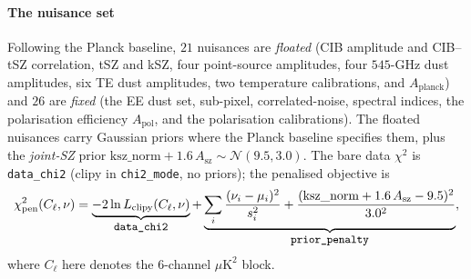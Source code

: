 \documentclass[11pt]{article}
\newcommand{\code}[1]{\texttt{\small #1}}
\newcommand{\Cl}{C_\ell}
\newcommand{\chisq}{\chi^2}
\begin{document}
\paragraph{The nuisance set}
Following the Planck baseline, $21$ nuisances are \emph{floated}
(CIB amplitude and CIB--tSZ correlation, tSZ and kSZ, four point-source
amplitudes, four $545$-GHz dust amplitudes, six TE dust amplitudes, two
temperature calibrations, and $A_{\mathrm{planck}}$) and $26$ are
\emph{fixed} (the EE dust set, sub-pixel, correlated-noise, spectral
indices, the polarisation efficiency $A_{\mathrm{pol}}$, and the
polarisation calibrations). The floated nuisances carry Gaussian priors
where the Planck baseline specifies them, plus the \emph{joint-SZ} prior
$\mathrm{ksz\_norm}+1.6\,A_{\mathrm{sz}}\sim\mathcal N(9.5,3.0)$. The bare
data $\chisq$ is \code{data\_chi2} (clipy in \code{chi2\_mode}, no
priors); the penalised objective is
\begin{equation}
\chisq_{\mathrm{pen}}(\Cl,\nu)=
\underbrace{-2\ln L_{\mathrm{clipy}}(\Cl,\nu)}_{\text{\code{data\_chi2}}}
+\underbrace{\sum_i\frac{(\nu_i-\mu_i)^2}{s_i^2}
+\frac{(\mathrm{ksz\_norm}+1.6\,A_{\mathrm{sz}}-9.5)^2}{3.0^2}}_{\text{\code{prior\_penalty}}} ,
\end{equation}
where $\Cl$ here denotes the $6$-channel $\mu\mathrm{K}^2$ block.
\end{document}
